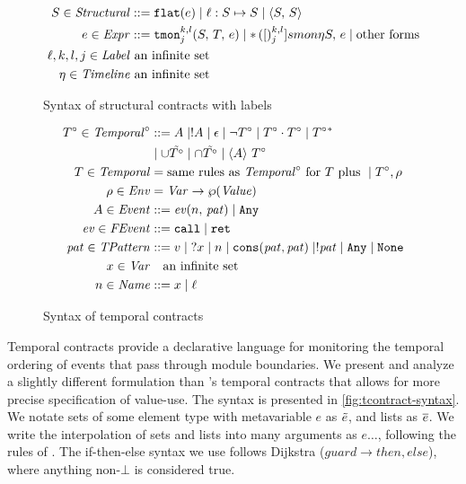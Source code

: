 \begin{figure}
  \begin{align*}
    S \in \mathit{Structural} &::= {\tt flat}(e) \mid \ell : S \mapsto S \mid \langle S,\, S\rangle
\\
    e \in \mathit{Expr} &::= {\tt tmon}{^{k,l}_{j}}({S,\,T,\,e})
                    \mid {\tt *}{\,}({[})^{k,l}_{j}]{smon}{\eta}{S,\, e}
                    \mid \text{other forms}
\\
\ell,k,l,j \in \mathit{Label}&\text{ an infinite set} \\
\eta \in \mathit{Timeline} &\text{ an infinite set}
  \end{align*}
  \caption{Syntax of structural contracts with labels}
  \label{fig:scontract-syntax}
\end{figure}

\begin{figure}
  \begin{align*}
  T^\circ \in \mathit{Temporal}^\circ &::=
      A \mid ! A
 \mid \epsilon
 \mid \neg T^\circ
 \mid T^\circ \cdot T^\circ
 \mid T^\circ{}^* \\
&\mid \cup \tilde{T^\circ}
 \mid \cap \tilde{T^\circ}
 \mid \langle A\rangle\ T^\circ
\\
T \in \mathit{Temporal} &= \text{same rules as } \mathit{Temporal}^\circ \text{ for } T \text{ plus } \mid T^\circ, \rho \\
\rho \in \mathit{Env} &= \mathit{Var} \to \wp(\mathit{Value}) \\
A \in \mathit{Event} &::= \mathit{ev}(n,\, \mathit{pat}) \mid {\tt Any} \\
\mathit{ev} \in \mathit{FEvent} &::= {\tt call} \mid {\tt ret} \\
\mathit{pat} \in \mathit{TPattern} &::= v \mid {\tt ?} x \mid n \mid {\tt cons}(\mathit{pat},\mathit{pat}) \mid ! \mathit{pat} \mid {\tt Any} \mid {\tt None} \\
x \in \mathit{Var} &\quad\text{an infinite set} \\
n \in \mathit{Name} &::= x \mid \ell
  \end{align*}
  \caption{Syntax of temporal contracts}
  \label{fig:tcontract-syntax}
\end{figure}

Temporal contracts provide a declarative language for monitoring the temporal ordering of events that pass through module boundaries.
%
We present and analyze a slightly different formulation than \dfm's temporal contracts that allows for more precise specification of value-use.
%
The syntax is presented in \autoref{fig:tcontract-syntax}.
%
We notate sets of some element type with metavariable $e$ as $\tilde{e}$, and lists as $\overline{e}$.
%
We write the interpolation of sets and lists into many arguments as $e\ldots$, following the rules of \citet{dvanhorn:Kohlbecker1987Macrobyexample}.
%
The if-then-else syntax we use follows Dijkstra ($\mathit{guard} \to \mathit{then}, \mathit{else}$), where anything non-$\bot$ is considered true.

